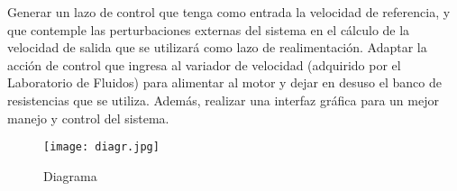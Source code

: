 Generar un lazo de control que tenga como entrada la velocidad de referencia, y que contemple las perturbaciones externas del sistema en el cálculo de la velocidad de salida que se utilizará como lazo de realimentación. 
Adaptar la acción de control que ingresa al variador de velocidad (adquirido por el Laboratorio de Fluidos) para alimentar al motor y dejar en desuso el banco de resistencias que se utiliza.
Además, realizar una interfaz gráfica para un mejor manejo y control del sistema.

\begin{figure}[htb]
	\centering
	\texttt{[image: diagr.jpg]}
	\caption{Diagrama}
	\label{fig:diagr}
	\end{figure}


	\newpage